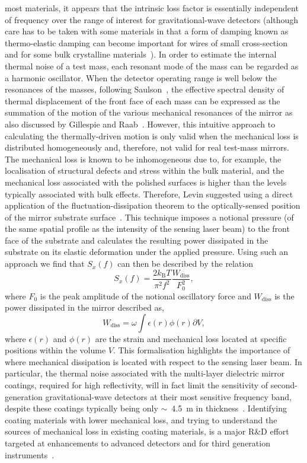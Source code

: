 \documentclass{article}
\newcommand{\mum}{\textmu\hspace{-0.2pt}m\xspace}
\begin{document}
most materials, it appears that the intrinsic loss factor is essentially
independent of frequency over the range of interest for gravitational-wave
detectors (although care has to be taken with some materials in that a form of
damping known as thermo-elastic damping can become important for wires of small
cross-section~\cite{Nowick} and for some bulk crystalline
materials~\cite{Bragthermo}). In order to estimate the internal thermal noise of
a test mass, each resonant mode of the mass can be regarded as a harmonic
oscillator. When the detector operating range is well below the resonances of
the masses, following Saulson~\cite{Saulson2}, the effective spectral density of
thermal displacement of the front face of each mass can be expressed as the
summation of the motion of the various mechanical resonances of the mirror as
also discussed by Gillespie and Raab~\cite{Gillespie}. However, this intuitive
approach to calculating the thermally-driven motion is only valid when the
mechanical loss is distributed homogeneously and, therefore, not valid for real
test-mass mirrors. The mechanical loss is known to be inhomogeneous due to, for
example, the localisation of structural defects and stress within the bulk
material, and the mechanical loss associated with the polished surfaces is
higher than the levels typically associated with bulk effects.  Therefore, Levin
suggested using a direct application of the fluctuation-dissipation theorem to
the optically-sensed position of the mirror substrate surface~\cite{Levin}.
This technique imposes a notional pressure (of the same spatial profile as the
intensity of the sensing laser beam) to the front face of the substrate and
calculates the resulting power dissipated in the substrate on its elastic
deformation under the applied pressure.  Using such an approach we find that
$S_x(f)$ can then be described by the relation
%
\begin{equation}
 S_x(f) = \frac{2k_\mathrm{B}T}{\pi^2 f^2} \frac{W_{\mathrm{diss}}}{F_0^2},
 \label{eqn:S-x_Levin}
\end{equation}
%
where $F_0$ is the peak amplitude of the notional oscillatory force and
$W_{\mathrm{diss}}$ is the power dissipated in the mirror described
as,
%
\begin{equation}
 W_{\mathrm{diss}} = \omega \int{\epsilon(r)\phi(r)\partial V},
 \label{eqn:S-x_Levin2}
\end{equation}
%
where $\epsilon(r)$ and $\phi(r)$ are the strain and mechanical loss located at
specific positions within the volume $V$. This formalisation highlights the
importance of where mechanical dissipation is located with respect to the
sensing laser beam.  In particular, the thermal noise associated with the
multi-layer dielectric mirror coatings, required for high reflectivity, will in
fact limit the sensitivity of second-generation gravitational-wave detectors at
their most sensitive frequency band, despite these coatings typically being only
$\sim$~4.5~\mum in thickness~\cite{Harry:2002}. Identifying coating
materials with lower mechanical loss, and trying to understand the sources of
mechanical loss in existing coating materials, is a major R\&D effort targeted
at enhancements to advanced detectors and for third generation
instruments~\cite{Martin:2008}.
\end{document}
